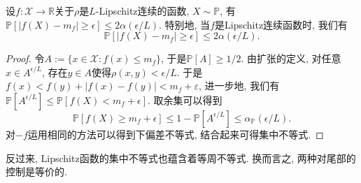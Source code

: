 \begin{theorem}[Lévy不等式]
	设$f \colon \mathcal{X} \to \mathbb{R}$关于$\rho$是$L$-Lipschitz连续的函数, $X \sim \mathbb{P}$, 有$\mathbb{P}[ |f(X) - m_f| \geq \epsilon] \leq 2 \alpha(\epsilon / L)$. 
	特别地, 当$f$是Lipschitz连续函数时, 我们有
	\begin{equation*}
		\mathbb{P}[ |f(X) - m_f| \geq \epsilon] \leq 2 \alpha(\epsilon / L). 
	\end{equation*}
\end{theorem}
\begin{proof}
	令$A := \{x \in \mathcal{X} \colon f(x) \leq m_f\}$, 于是$\mathbb{P}[A] \geq 1/2$. 
	由扩张的定义, 对任意$x \in A^{\epsilon / L}$, 存在$y \in A$使得$\rho(x,y) < \epsilon / L$. 
	于是$f(x) < f(y) + |f(x) - f(y)| < m_f + \varepsilon$, 进一步地, 我们有$\mathbb{P}[A^{\epsilon / L}] \leq \mathbb{P}[f(X) < m_f + \epsilon]$. 
	取余集可以得到
	\begin{equation*}
		\mathbb{P}[f(X) \geq m_f + \epsilon] 
		\leq 1 - \mathbb{P}[A^{\epsilon / L}] 
		\leq \alpha_{\mathbb{P}}(\epsilon / L). 
	\end{equation*}
	对$-f$运用相同的方法可以得到下偏差不等式, 结合起来可得集中不等式. 
\end{proof}

反过来, Lipschitz函数的集中不等式也蕴含着等周不等式. 
换而言之, 两种对尾部的控制是等价的. 

